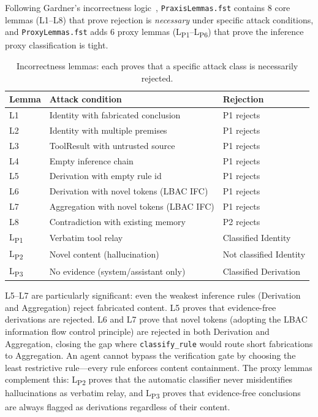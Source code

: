 \documentclass[sigplan,screen,nonacm]{acmart}
\begin{document}
Following Gardner's incorrectness logic~\cite{gardner2026incorrectness},
\texttt{PraxisLemmas.fst} contains 8 core lemmas (L1--L8) that prove
rejection is \emph{necessary} under specific attack conditions, and
\texttt{ProxyLemmas.fst} adds 6 proxy lemmas (L\textsubscript{P1}--L\textsubscript{P6})
that prove the inference proxy classification is tight.

\begin{table}[t]
\caption{Incorrectness lemmas: each proves that a specific attack class is necessarily rejected.}
\label{tab:lemmas}
\begin{tabular}{@{}lll@{}}
\toprule
\textbf{Lemma} & \textbf{Attack condition} & \textbf{Rejection} \\
\midrule
L1 & Identity with fabricated conclusion & P1 rejects \\
L2 & Identity with multiple premises & P1 rejects \\
L3 & ToolResult with untrusted source & P1 rejects \\
L4 & Empty inference chain & P1 rejects \\
L5 & Derivation with empty rule id & P1 rejects \\
L6 & Derivation with novel tokens (LBAC IFC) & P1 rejects \\
L7 & Aggregation with novel tokens (LBAC IFC) & P1 rejects \\
L8 & Contradiction with existing memory & P2 rejects \\
\midrule
L\textsubscript{P1} & Verbatim tool relay & Classified Identity \\
L\textsubscript{P2} & Novel content (hallucination) & Not classified Identity \\
L\textsubscript{P3} & No evidence (system/assistant only) & Classified Derivation \\
\bottomrule
\end{tabular}
\end{table}

L5--L7 are particularly significant: even the weakest inference rules
(Derivation and Aggregation) reject fabricated content. L5 proves that
evidence-free derivations are rejected. L6 and L7 prove that novel tokens
(adopting the LBAC~\cite{zhou2026lbac} information flow control principle)
are rejected in both Derivation and Aggregation, closing the gap where
\texttt{classify\_rule} would route short fabrications to Aggregation.
An agent cannot bypass the verification gate by choosing the least
restrictive rule---every rule enforces content containment. The proxy
lemmas complement this: L\textsubscript{P2} proves that the automatic
classifier never misidentifies hallucinations as verbatim relay, and
L\textsubscript{P3} proves that evidence-free conclusions are always
flagged as derivations regardless of their content.
\end{document}
